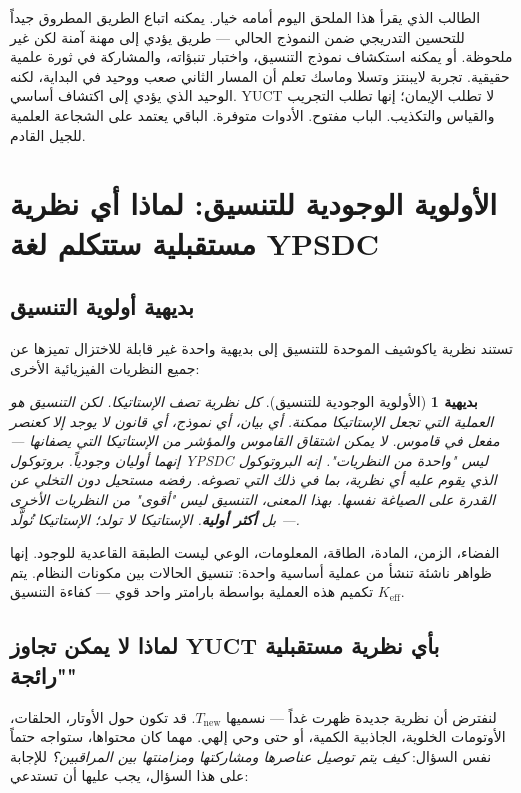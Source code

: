 \documentclass[12pt,a4paper]{article}
\newtheorem{axiom}{بديهية}[section]
\begin{document}
	الطالب الذي يقرأ هذا الملحق اليوم أمامه خيار. يمكنه اتباع الطريق المطروق جيداً للتحسين التدريجي ضمن النموذج الحالي — طريق يؤدي إلى مهنة آمنة لكن غير ملحوظة. أو يمكنه استكشاف نموذج التنسيق، واختبار تنبؤاته، والمشاركة في ثورة علمية حقيقية. تجربة لايبنتز وتسلا وماسك تعلم أن المسار الثاني صعب ووحيد في البداية، لكنه الوحيد الذي يؤدي إلى اكتشاف أساسي. YUCT لا تطلب الإيمان؛ إنها تطلب التجريب والقياس والتكذيب. الباب مفتوح. الأدوات متوفرة. الباقي يعتمد على الشجاعة العلمية للجيل القادم.
	
	\section{الأولوية الوجودية للتنسيق: لماذا أي نظرية مستقبلية ستتكلم لغة YPSDC}
	
	\subsection{بديهية أولوية التنسيق}
	
	تستند نظرية ياكوشيف الموحدة للتنسيق إلى بديهية واحدة غير قابلة للاختزال تميزها عن جميع النظريات الفيزيائية الأخرى:
	
	\begin{axiom}[الأولوية الوجودية للتنسيق]
		كل نظرية تصف الإستاتيكا. لكن التنسيق هو العملية التي تجعل الإستاتيكا ممكنة. أي بيان، أي نموذج، أي قانون لا يوجد إلا كعنصر مفعل في قاموس. لا يمكن اشتقاق القاموس والمؤشر من الإستاتيكا التي يصفانها — إنهما أوليان وجودياً. بروتوكول YPSDC ليس "واحدة من النظريات". إنه البروتوكول الذي يقوم عليه أي نظرية، بما في ذلك التي تصوغه. رفضه مستحيل دون التخلي عن القدرة على الصياغة نفسها. بهذا المعنى، التنسيق ليس "أقوى" من النظريات الأخرى — بل \textbf{أكثر أولية}. الإستاتيكا لا تولد؛ الإستاتيكا تُولَّد.
	\end{axiom}
	
	الفضاء، الزمن، المادة، الطاقة، المعلومات، الوعي ليست الطبقة القاعدية للوجود. إنها ظواهر ناشئة تنشأ من عملية أساسية واحدة: تنسيق الحالات بين مكونات النظام. يتم تكميم هذه العملية بواسطة بارامتر واحد قوي — كفاءة التنسيق \(K_{\mathrm{eff}}\).
	
	\subsection{لماذا لا يمكن تجاوز YUCT بأي نظرية مستقبلية "رائجة"}
	
	لنفترض أن نظرية جديدة ظهرت غداً — نسميها \(T_{\text{new}}\). قد تكون حول الأوتار، الحلقات، الأوتومات الخلوية، الجاذبية الكمية، أو حتى وحي إلهي. مهما كان محتواها، ستواجه حتماً نفس السؤال: \emph{كيف يتم توصيل عناصرها ومشاركتها ومزامنتها بين المراقبين؟} للإجابة على هذا السؤال، يجب عليها أن تستدعي:
	
\end{document}
